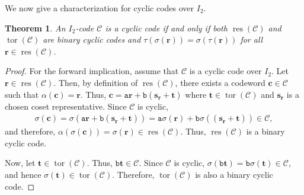 \documentclass[12pt]{article}
\newtheorem{theorem}{Theorem}[section]
\theoremstyle{definition}
\theoremstyle{plain}
\newcommand{\Blue}[1]{{ \color{blue} #1}}
\begin{document}
We now give a characterization for  cyclic codes over $I_2$.


\begin{theorem}  \label{thm:cyclic code characterization}
An $I_2$-code $\mathcal{C}$ is a cyclic code if and only if both $\operatorname{res} (\mathcal{C})$ and $\operatorname{tor} (\mathcal{C})$ are binary cyclic  codes and $\tau (\sigma (\mathbf{r})) = \sigma ( \tau (\mathbf{r})  )$ for all $\mathbf{r} \in \operatorname{res} (\mathcal{C})$.
\end{theorem}




\begin{proof}
For the forward implication, assume that $\mathcal{C}$ is a cyclic code over $I_2$.
Let $\mathbf{r} \in \operatorname{res} (\mathcal{C})$. Then, by definition of $\operatorname{res}(\mathcal{C})$, there exists a codeword $\mathbf{c} \in \mathcal{C}$ such that $\alpha(\mathbf{c}) = \mathbf{r}$. Thus, $\mathbf{c} = \mathtt{a} \mathbf{r} + \mathtt{b} ( \mathbf{s}_{\mathbf{r}}  + \mathbf{t} )$ where $\mathbf{t} \in \operatorname{tor} ( \mathcal{C} )$ and $\mathbf{s}_{\mathbf{r}}$ is a chosen coset representative. Since $\mathcal{C}$ is cyclic,
\begin{align*}
\sigma(\mathbf{c})
= \sigma ( \mathtt{a} \mathbf{r} + \mathtt{b} ( \mathbf{s}_{\mathbf{r}}  + \mathbf{t}   )  )
= \mathtt{a} \sigma(\mathbf{r}) + \mathtt{b} \sigma( (  \mathbf{s}_{\mathbf{r}}  + \mathbf{t}   )   ) \in \mathcal{C},
\end{align*}
and therefore,
$
\alpha(\sigma(\mathbf{c})) = \sigma(\mathbf{r}) \in \operatorname{res}(\mathcal{C})
$.
Thus, $\operatorname{res}(\mathcal{C})$ is a binary cyclic code.

Now, let $\mathbf{t} \in \operatorname{tor}(\mathcal{C})$. Thus, $\mathtt{b} \mathbf{t} \in \mathcal{C}$. Since $\mathcal{C}$ is cyclic,
$
\sigma( \mathtt{b} \mathbf{t}) = \mathtt{b} \sigma ( \mathbf{t} ) \in \mathcal{C}
$,
and hence $\sigma(\mathbf{t}) \in \operatorname{tor}(\mathcal{C})$. Therefore, $\operatorname{tor}(\mathcal{C})$ is also a binary cyclic code.



\end{proof}
\end{document}
